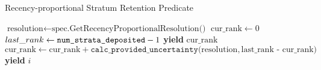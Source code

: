 \begin{algorithm}
\caption{Recency-proportional Stratum Retention Predicate}
\label{alg:recency-proportional-resolution-algo-pred-keep-rank}
\begin{algorithmic}[1]
    \STATE $\text{resolution} \gets \text{spec.GetRecencyProportionalResolution()}$
    \STATE $\text{cur\_rank} \gets 0$
    \STATE $last\_rank \gets \texttt{num\_\text{strata}\_\text{deposited}} - 1$
        \STATE \textbf{yield} $\text{cur\_rank}$
        \STATE $\text{cur\_rank} \gets \text{cur\_rank} + \texttt{calc\_provided\_uncertainty(} \text{resolution}, \text{last\_rank - cur\_rank} \texttt{)}$
    \ENDWHILE
        \STATE \textbf{yield} $i$
    \ENDFOR
\end{algorithmic}
\end{algorithm}
